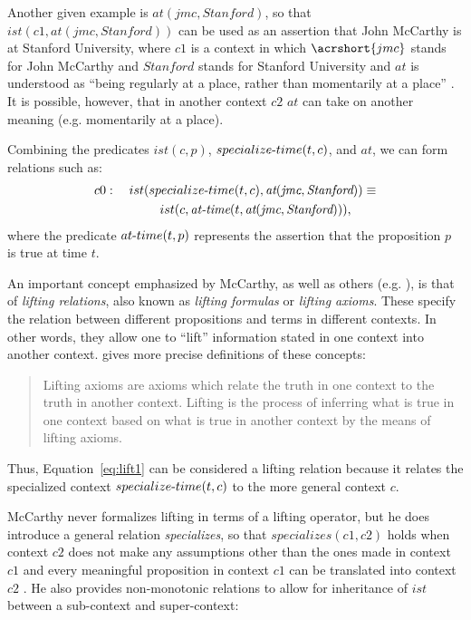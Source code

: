 Another given example is $at(jmc, Stanford)$, so that $ist(c1, at(jmc, Stanford))$ can be used as an assertion that John McCarthy  is at Stanford University, where $c1$ is a context in which $\acrshort{jmc}$ stands for John McCarthy and $Stanford$ stands for Stanford University and $at$ is understood as ``being regularly at a place, rather than momentarily at a place'' \cite{McCarthy1993}. It is possible, however, that in another context $c2$ $at$ can take on another meaning (e.g. momentarily at a place).

Combining the predicates $ist(c, p)$, $specialize\textnormal{-}time(t, c)$, and $at$, we can form relations such as:
\begin{equation}
\label{eq:lift1}
\begin{aligned}
c0: \quad ist(specialize\textnormal{-}time(t,c),\hbox{\it at}
(\hbox{\it jmc},\hbox{\it Stanford}))
\equiv \\
ist(c,\hbox{\it at-time}(t,\hbox{\it at}(\hbox{\it jmc},
\hbox{\it Stanford}))),
\qquad
\end{aligned}
\end{equation}
where the predicate $at\textnormal{-}time(t,p)$ represents the assertion that the proposition $p$ is true at time $t$. 

An important concept emphasized by McCarthy, as well as others (e.g. \cite{guha1991contexts}), is that of \emph{lifting relations}, also known as \emph{lifting formulas} or \emph{lifting axioms}. These specify the relation between different propositions and terms in different contexts. In other words, they allow one to ``lift'' information stated in one context into another context. \cite{mccarthy1997formalizing} gives more precise definitions of these concepts:
\begin{quote}
Lifting axioms are axioms which relate the truth in one context
to the truth in another context.
Lifting is the process of inferring what is true in one context based
on what is true in another context by the means of lifting axioms.
\end{quote}
Thus, Equation~\ref{eq:lift1} can be considered a lifting relation because it relates the specialized context $specialize\textnormal{-}time(t, c)$ to the more general context $c$. 

McCarthy never formalizes lifting in terms of a lifting operator, but he does introduce a general relation \emph{specializes}, so that $specializes(c1,c2)$ holds when context $c2$ does not make any assumptions other than the ones made in context $c1$ and every meaningful proposition in context $c1$ can be translated into context $c2$ \cite{McCarthy1993}. He also provides non-monotonic relations to allow for inheritance of $ist$ between a sub-context and super-context:


